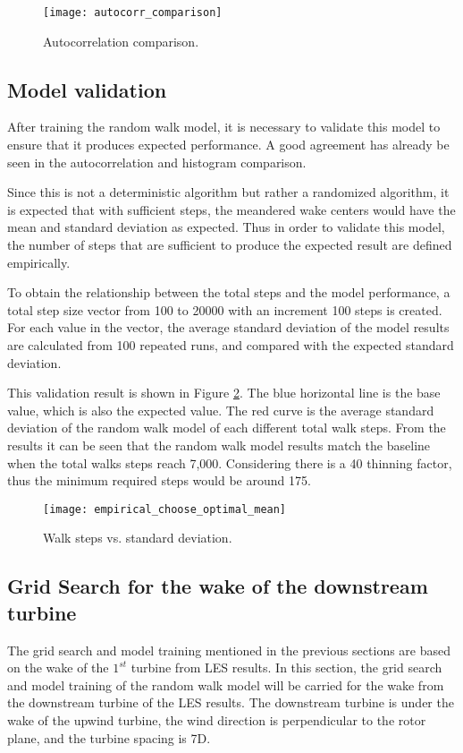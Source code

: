 \documentclass{umthesis}
\begin{document}
\begin{figure}
  \centering
  \texttt{[image: autocorr\_comparison]}
  \caption{Autocorrelation comparison.}\label{fig:autocorr_comparison}
\end{figure}

\subsection{Model validation}
After training the random walk model, it is necessary to validate this model to ensure that it produces expected performance. A good agreement has already be seen in the autocorrelation and histogram comparison.

Since this is not a deterministic algorithm but rather a randomized algorithm, it is expected that with sufficient steps, the meandered wake centers would have the mean and standard deviation as expected. Thus in order to validate this model, the number of steps that are sufficient to produce the expected result are defined empirically.

To obtain the relationship between the total steps and the model performance, a total step size vector from 100 to 20000 with an increment 100 steps is created. For each value in the vector, the average standard deviation of the model results are calculated from 100 repeated runs, and compared with the expected standard deviation.

This validation result is shown in Figure \ref{fig:empirical}. The blue horizontal line is the base value, which is also the expected value. The red curve is the average standard deviation of the random walk model of each different total walk steps. From the results it can be seen that the random walk model results match the baseline when the total walks steps reach 7,000. Considering there is a 40 thinning factor, thus the minimum required steps would be around 175. 

\begin{figure}
  \centering
  \texttt{[image: empirical\_choose\_optimal\_mean]}
  \caption{Walk steps vs. standard deviation.}\label{fig:empirical}
\end{figure}

\subsection{Grid Search for the wake of the downstream turbine}
The grid search and model training mentioned in the previous sections are based on the wake of the $1^{st}$ turbine from LES results. In this section, the grid search and model training of the random walk model will be carried for the wake from the downstream turbine of the LES results. The downstream turbine is under the wake of the upwind turbine, the wind direction is perpendicular to the rotor plane, and the turbine spacing is 7D. 
\end{document}
